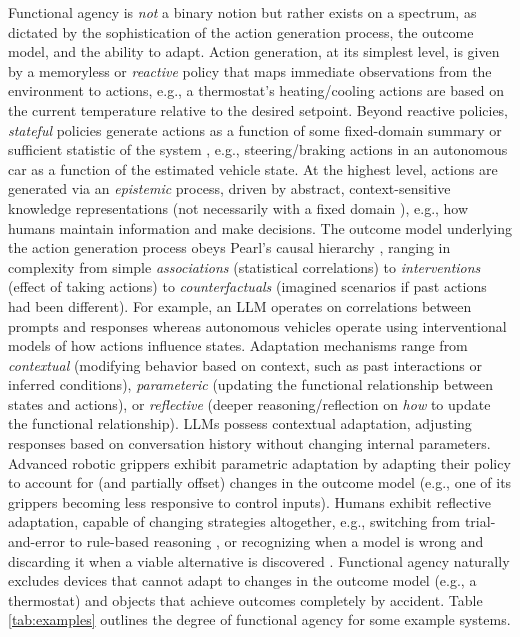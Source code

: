 \documentclass{article}
\theoremstyle{plain}
\theoremstyle{definition}
\theoremstyle{remark}
\begin{document}
Functional agency is \emph{not} a binary notion but rather exists on a spectrum, as dictated by the sophistication of the action generation process, the outcome model, and the ability to adapt. 
Action generation, at its simplest level, is given by a memoryless or \emph{reactive} policy \cite{singh1994learning} that maps immediate observations from the environment to actions, e.g., a thermostat's heating/cooling actions are based on the current temperature relative to the desired setpoint. Beyond reactive policies, \emph{stateful} policies generate actions as a function of some fixed-domain summary or sufficient statistic of the system \cite{kumar1986stochastic,hauskrecht2000value,tavafoghi2018sufficient,tavafoghi2021unified}, e.g., steering/braking actions in an autonomous car as a function of the estimated vehicle state. At the highest level, actions are generated via an \emph{epistemic} process, driven by abstract, context-sensitive knowledge representations (not necessarily with a fixed domain \cite{spelke2007core,tenenbaum2011grow}), e.g., how humans maintain information and make decisions. 
%
The outcome model underlying the action generation process obeys Pearl's causal hierarchy \cite{pearl2009causality}, ranging in complexity from simple \emph{associations} (statistical correlations) to \emph{interventions} (effect of taking actions) to \emph{counterfactuals} (imagined scenarios if past actions had been different). For example, an LLM operates on correlations between prompts and responses whereas autonomous vehicles operate using interventional models of how actions influence states. 
%
Adaptation mechanisms range from \emph{contextual} (modifying behavior based on context, such as past interactions or inferred conditions), \emph{parameteric} (updating the functional relationship between states and actions), or \emph{reflective} (deeper reasoning/reflection on \emph{how} to update the functional relationship). LLMs possess contextual adaptation, adjusting responses based on conversation history without changing internal parameters. Advanced robotic grippers \cite{openai2018learning,xu2021adagrasp} exhibit parametric adaptation by adapting their policy to account for (and partially offset) changes in the outcome model (e.g., one of its grippers becoming less responsive to control inputs). Humans exhibit reflective adaptation, capable of changing strategies altogether, e.g., switching from trial-and-error to rule-based reasoning \cite{lieder2020resource}, or recognizing when a model is wrong and discarding it when a viable alternative is discovered \cite{kuhn1997structure}. 
Functional agency naturally excludes devices that cannot adapt to changes in the outcome model (e.g., a thermostat) and objects that achieve outcomes completely by accident. Table \ref{tab:examples} outlines the degree of functional agency for some example systems.
\end{document}
